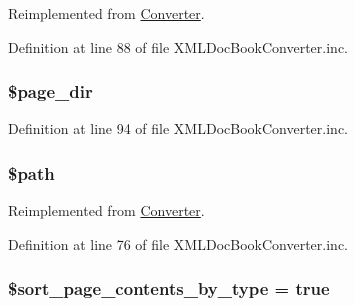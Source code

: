 \-Reimplemented from \hyperlink{class_converter_a22fa57ada47299e1b00ca90f550a1194}{\-Converter}.



\-Definition at line 88 of file \-X\-M\-L\-Doc\-Book\-Converter.\-inc.

\hypertarget{class_x_m_l_doc_book_converter_ab554c658003c5e2653580ba881cd50eb}{
\subsubsection[{\$page\-\_\-dir}]{\setlength{\rightskip}{0pt plus 5cm}\$page\-\_\-dir}}\label{class_x_m_l_doc_book_converter_ab554c658003c5e2653580ba881cd50eb}


\-Definition at line 94 of file \-X\-M\-L\-Doc\-Book\-Converter.\-inc.

\hypertarget{class_x_m_l_doc_book_converter_a0a4baf0b22973c07685c3981f0d17fc4}{
\subsubsection[{\$path}]{\setlength{\rightskip}{0pt plus 5cm}\$path}}\label{class_x_m_l_doc_book_converter_a0a4baf0b22973c07685c3981f0d17fc4}


\-Reimplemented from \hyperlink{class_converter_a0a4baf0b22973c07685c3981f0d17fc4}{\-Converter}.



\-Definition at line 76 of file \-X\-M\-L\-Doc\-Book\-Converter.\-inc.

\hypertarget{class_x_m_l_doc_book_converter_ab5dae87e1968b35e37687a763216a835}{
\subsubsection[{\$sort\-\_\-page\-\_\-contents\-\_\-by\-\_\-type}]{\setlength{\rightskip}{0pt plus 5cm}\$sort\-\_\-page\-\_\-contents\-\_\-by\-\_\-type = true}}\label{class_x_m_l_doc_book_converter_ab5dae87e1968b35e37687a763216a835}


